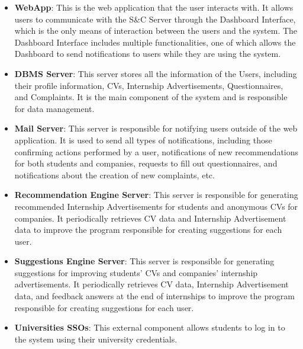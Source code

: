 \begin{itemize}
    \item \textbf{WebApp}: This is the web application that the user interacts with. It allows users to communicate 
                            with the S\&C Server through the Dashboard Interface, which is the only means of interaction 
                            between the users and the system. The Dashboard Interface includes multiple functionalities,
                            one of which allows the Dashboard to send notifications to users while they are using the system.
    \item \textbf{DBMS Server}: This server stores all the information of the Users, including their profile information, CVs, 
                                Internship Advertisements, Questionnaires, and Complaints. It is the main component of the system and is 
                                responsible for data management.
    \item \textbf{Mail Server}: This server is responsible for notifying users outside of the web application. 
                                It is used to send all types of notifications, including those confirming actions performed by a user,
                                notifications of new recommendations for both students and companies, requests to fill out questionnaires,
                                and notifications about the creation of new complaints, etc.
    \item \textbf{Recommendation Engine Server}: This server is responsible for generating recommended Internship Advertisements for students 
                                                and anonymous CVs for companies. It periodically retrieves CV data and Internship Advertisement data 
                                                to improve the program responsible for creating suggestions for each user.
    \item \textbf{Suggestions Engine Server}: This server is responsible for generating suggestions for improving students' CVs and companies' internship advertisements.
                                            It periodically retrieves CV data, Internship Advertisement data, and feedback answers at the end of internships 
                                            to improve the program responsible for creating suggestions for each user.
    \item \textbf{Universities SSOs}: This external component allows students to log in to the system using their university credentials.
\end{itemize}


